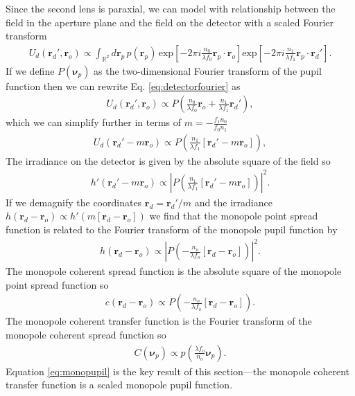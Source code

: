 \documentclass[]{osa-article}
\providecommand{\ro}{\mathbf{\mathbf{r}}_o}
\providecommand{\rp}{\mathbf{r}_p}
\providecommand{\rd}{\mathbf{r}_d}
\providecommand{\mbb}[1]{\mathbb{#1}}
\providecommand{\bs}[1]{\boldsymbol{#1}}
\providecommand{\bvp}{\bs{\nu}_p}
\begin{document}
Since the second lens is paraxial, we can model with relationship between the
field in the aperture plane and the field on the detector with a scaled Fourier
transform \cite{goodman1996}
\begin{align}
   U_d(\rd', \ro) \propto \int_{\mbb{R}^2}d\rp\, p(\rp)\,\text{exp}\left[-2\pi i \frac{n_0}{\lambda f_0} \rp\cdot\ro \right]\text{exp}\left[-2\pi i \frac{n_1}{\lambda f_1} \rp\cdot\rd' \right]. \label{eq:detectorfourier}
\end{align}
If we define $P(\bvp)$ as the two-dimensional Fourier transform of the pupil function
then we can rewrite Eq. \ref{eq:detectorfourier} as
\begin{align}
  U_d(\rd', \ro) \propto P\left(\frac{n_0}{\lambda f_0}\ro + \frac{n_1}{\lambda f_1}\rd'\right),
\end{align}
which we can simplify further in terms of $m = -\frac{f_1n_0}{f_0n_1}$
\begin{align}
  U_d(\rd' - m\ro) \propto P\left(\frac{n_1}{\lambda f_1}[\rd' - m\ro]\right),
\end{align}
The irradiance on the detector is given by the absolute square of the field so
\begin{align}
  h'(\rd' - m\ro) \propto \left|P\left(\frac{n_1}{\lambda f_1}[\rd' - m\ro]\right)\right|^2.
\end{align}
If we demagnify the coordinates $\rd = \rd'/m$ and the irradiance
$h(\rd - \ro) \propto h'(m[\rd - \ro])$ we find that the monopole point spread function
is related to the Fourier transform of the monopole pupil function by
\begin{align}
  h(\rd - \ro) \propto \left|P\left(-\frac{n_o}{\lambda f_o}[\rd - \ro]\right)\right|^2.
\end{align}
The monopole coherent spread function is the absolute square of the monopole point spread function so
\begin{align}
  c(\rd - \ro) \propto P\left(-\frac{n_o}{\lambda f_o}[\rd - \ro]\right).
\end{align}
The monopole coherent transfer function is the Fourier transform of the monopole coherent spread function so
\begin{align}
  C(\bvp) \propto p\left(\frac{\lambda f_o}{n_o}\bvp\right). \label{eq:monopupil}
\end{align}
Equation \ref{eq:monopupil} is the key result of this section---the monopole
coherent transfer function is a scaled monopole pupil function.
\end{document}
